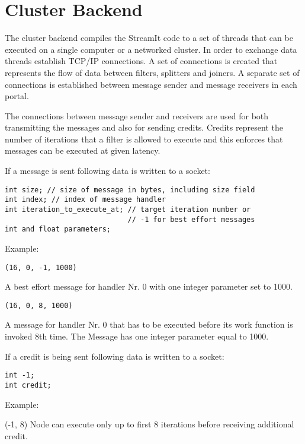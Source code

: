 \section{Cluster Backend}

The cluster backend compiles the StreamIt code to a set of threads
that can be executed on a single computer or a networked cluster. In
order to exchange data threads establish TCP/IP connections. A set of
connections is created that represents the flow of data between
filters, splitters and joiners. A separate set of connections is
established between message sender and message receivers in each
portal.

The connections between message sender and receivers are used for both
transmitting the messages and also for sending credits. Credits
represent the number of iterations that a filter is allowed to execute
and this enforces that messages can be executed at given latency.

If a message is sent following data is written to a socket:

{\scriptsize
\begin{verbatim}
int size; // size of message in bytes, including size field
int index; // index of message handler
int iteration_to_execute_at; // target iteration number or
                             // -1 for best effort messages 
int and float parameters;
\end{verbatim}}

Example:

{\scriptsize
\begin{verbatim}
(16, 0, -1, 1000)
\end{verbatim}}

A best effort message for handler Nr. 0 with one integer parameter set
to 1000.

{\scriptsize
\begin{verbatim}
(16, 0, 8, 1000)
\end{verbatim}}

A message for handler Nr. 0 that has to be executed before its work
function is invoked 8th time. The Message has one integer parameter equal
to 1000.

If a credit is being sent following data is written to a socket:

{\scriptsize
\begin{verbatim}
int -1; 
int credit; 
\end{verbatim}}

Example:

(-1, 8) Node can execute only up to first 8 iterations before receiving additional credit.


